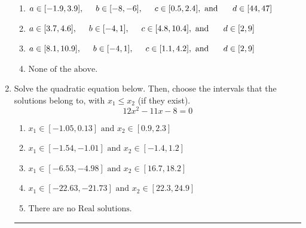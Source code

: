 \documentclass[14pt]{extbook}
\newcommand{\litem}[1]{\item#1\hspace*{-1cm}\rule{\textwidth}{0.4pt}}
\begin{document}
\begin{enumerate}
{\begin{enumerate}[label=\Alph*.]
\item \( a \in [-1.9, 3.9], \hspace*{5mm} b \in [-8, -6], \hspace*{5mm} c \in [0.5, 2.4], \text{ and } \hspace*{5mm} d \in [44, 47] \)
\item \( a \in [3.7, 4.6], \hspace*{5mm} b \in [-4, 1], \hspace*{5mm} c \in [4.8, 10.4], \text{ and } \hspace*{5mm} d \in [2, 9] \)
\item \( a \in [8.1, 10.9], \hspace*{5mm} b \in [-4, 1], \hspace*{5mm} c \in [1.1, 4.2], \text{ and } \hspace*{5mm} d \in [2, 9] \)
\item \( \text{None of the above.} \)

\end{enumerate} }
\litem{
Solve the quadratic equation below. Then, choose the intervals that the solutions belong to, with $x_1 \leq x_2$ (if they exist).\[ 12x^{2} -11 x -8 = 0 \]\begin{enumerate}[label=\Alph*.]
\item \( x_1 \in [-1.05, 0.13] \text{ and } x_2 \in [0.9, 2.3] \)
\item \( x_1 \in [-1.54, -1.01] \text{ and } x_2 \in [-1.4, 1.2] \)
\item \( x_1 \in [-6.53, -4.98] \text{ and } x_2 \in [16.7, 18.2] \)
\item \( x_1 \in [-22.63, -21.73] \text{ and } x_2 \in [22.3, 24.9] \)
\item \( \text{There are no Real solutions.} \)


\end{enumerate}}
\end{enumerate}
\end{document}
